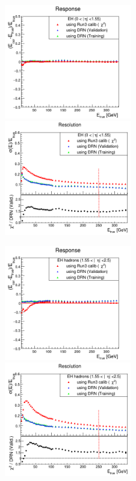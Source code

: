 \begin{figure}
\includegraphics[width=0.495\textwidth]{./plots_pdf/HCAL_plots/Trained_target_ratioflip_0_500_10/pdf/EH_barrel/barrel_corrEtaBarrelEcalHcal.png}
\includegraphics[width=0.495\textwidth]{./plots_pdf/HCAL_plots/Trained_target_ratioflip_0_500_10/pdf/EH_barrel/barrel_corrEtaBarrelEcalHcal_reso.png}

\includegraphics[width=0.495\textwidth]{./plots_pdf/HCAL_plots/Trained_target_ratioflip_0_500_10/pdf/EH_ec_in/EC_within_tracker_corrEtaEndcapEcalHcal.png}
\includegraphics[width=0.495\textwidth]{./plots_pdf/HCAL_plots/Trained_target_ratioflip_0_500_10/pdf/EH_ec_in/EC_within_tracker_corrEtaEndcapEcalHcal_reso.png}


\end{figure}
